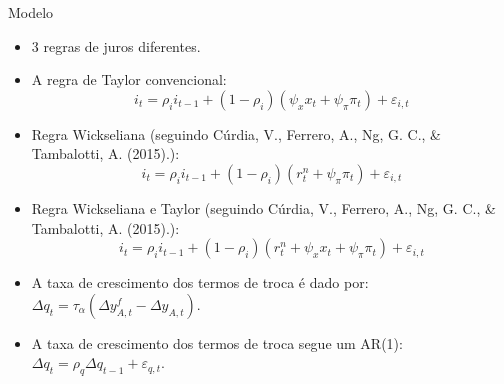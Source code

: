\documentclass[9pt]{beamer}
\let\olditem\item
\renewcommand{\item}{%
\olditem\vspace{\fill}}
\begin{document}
\begin{frame}{Modelo}
\begin{itemize}
\item 3 regras de juros diferentes.

\item A regra de Taylor convencional:
\begin{equation*}
    i_t = \rho_i i_{t-1} + (1 - \rho_i)(\psi_{x}x_t + \psi_{\pi} \pi_t) + \varepsilon_{i,t}
\end{equation*}

\item Regra Wickseliana (seguindo Cúrdia, V., Ferrero, A., Ng, G. C., & Tambalotti, A. (2015).):
\begin{equation*}
    i_t = \rho_i i_{t-1} + (1 - \rho_i)(r_t^{n} + \psi_{\pi} \pi_t) + \varepsilon_{i,t}
\end{equation*}

\item Regra Wickseliana e Taylor (seguindo Cúrdia, V., Ferrero, A., Ng, G. C., & Tambalotti, A. (2015).):
\begin{equation*}
    i_t = \rho_i i_{t-1} + (1 - \rho_i)(r_t^{n} + \psi_{x}x_t + \psi_{\pi} \pi_t) + \varepsilon_{i,t}
\end{equation*}

\item A taxa de crescimento dos termos de troca é dado por: $\Delta q_t = \tau_{\alpha}(\Delta y_{A,t}^{f} - \Delta y_{A,t})$.

\item A taxa de crescimento dos termos de troca segue um AR(1):$\Delta q_t = \rho_q \Delta q_{t-1} + \varepsilon_{q,t}$.


\end{itemize}
\end{frame}
\end{document}
